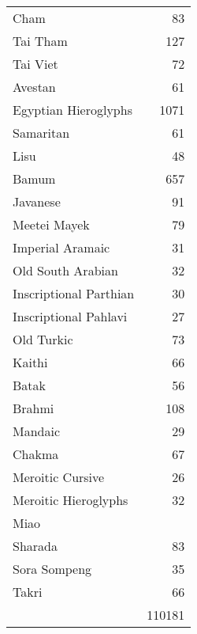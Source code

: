 \begin{longtable}{p{6cm}r}
Cham	 &83\\
Tai Tham	&127\\
Tai Viet	&72\\
Avestan	&61\\
Egyptian Hieroglyphs	&1071\\
Samaritan	 &61\\
Lisu	&48\\
Bamum	&657\\
Javanese	&91\\
Meetei Mayek	\pageref{s:meetei} &79\\
Imperial Aramaic	&31\\
Old South Arabian	&32\\
Inscriptional Parthian	 &30\\
Inscriptional Pahlavi	&27\\
Old Turkic	&73\\
Kaithi	 &66\\
Batak	 &56\\
Brahmi \pageref{s:brahmi}	 &108\\
Mandaic	&29\\
Chakma	&67\\
Meroitic Cursive	&26\\
Meroitic Hieroglyphs	&32\\
Miao	& \pageref{s:miao}\\
Sharada	\pageref{s:sharada} &83\\
Sora Sompeng	&35\\
Takri	&66\\
	
	&110181\\
\end{longtable}

